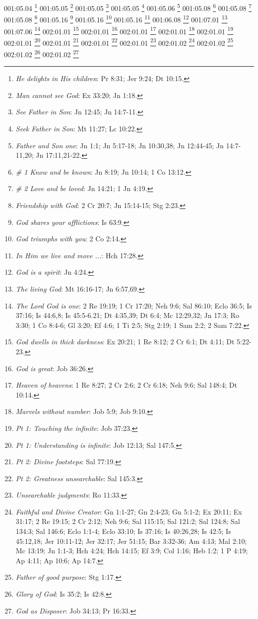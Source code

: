 {001:05.04 \footnote{\textit{He delights in His children}: Pr 8:31; Jer 9:24; Dt 10:15.}
001:05.05 \footnote{\textit{Man cannot see God}: Ex 33:20; Jn 1:18.}
001:05.05 \footnote{\textit{See Father in Son}: Jn 12:45; Jn 14:7-11.}
001:05.05 \footnote{\textit{Seek Father in Son}: Mt 11:27; Lc 10:22.}
001:05.06 \footnote{\textit{Father and Son one}: Jn 1:1; Jn 5:17-18; Jn 10:30,38; Jn 12:44-45; Jn 14:7-11,20; Jn 17:11,21-22.}
001:05.08 \footnote{\textit{# 1 Know and be known}: Jn 8:19; Jn 10:14; 1 Co 13:12.}
001:05.08 \footnote{\textit{# 2 Love and be loved}: Jn 14:21; 1 Jn 4:19.}
001:05.08 \footnote{\textit{Friendship with God}: 2 Cr 20:7; Jn 15:14-15; Stg 2:23.}
001:05.16 \footnote{\textit{God shares your afflictions}: Is 63:9.}
001:05.16 \footnote{\textit{God triumphs with you}: 2 Co 2:14.}
001:05.16 \footnote{\textit{In Him we live and move ...}: Hch 17:28.}
001:06.08 \footnote{\textit{God is a spirit}: Jn 4:24.}
001:07.01 \footnote{\textit{The living God}: Mt 16:16-17; Jn 6:57,69.}
001:07.06 \footnote{\textit{The Lord God is one}: 2 Re 19:19; 1 Cr 17:20; Neh 9:6; Sal 86:10; Eclo 36:5; Is 37:16; Is 44:6,8; Is 45:5-6.21; Dt 4:35,39; Dt 6:4; Mc 12:29,32; Jn 17:3; Ro 3:30; 1 Co 8:4-6; Gl 3:20; Ef 4:6; 1 Ti 2:5; Stg 2:19; 1 Sam 2:2; 2 Sam 7:22.}
002:01.01 \footnote{\textit{God dwells in thick darkness}: Ex 20:21; 1 Re 8:12; 2 Cr 6:1; Dt 4:11; Dt 5:22-23.}
002:01.01 \footnote{\textit{God is great}: Job 36:26.}
002:01.01 \footnote{\textit{Heaven of heavens}: 1 Re 8:27; 2 Cr 2:6; 2 Cr 6:18; Neh 9:6; Sal 148:4; Dt 10:14.}
002:01.01 \footnote{\textit{Marvels without number}: Job 5:9; Job 9:10.}
002:01.01 \footnote{\textit{Pt 1: Touching the infinite}: Job 37:23.}
002:01.01 \footnote{\textit{Pt 1: Understanding is infinite}: Job 12:13; Sal 147:5.}
002:01.01 \footnote{\textit{Pt 2: Divine footsteps}: Sal 77:19.}
002:01.01 \footnote{\textit{Pt 2: Greatness unsearchable}: Sal 145:3.}
002:01.01 \footnote{\textit{Unsearchable judgments}: Ro 11:33.}
002:01.02 \footnote{\textit{Faithful and Divine Creator}: Gn 1:1-27; Gn 2:4-23; Gn 5:1-2; Ex 20:11; Ex 31:17; 2 Re 19:15; 2 Cr 2:12; Neh 9:6; Sal 115:15; Sal 121:2; Sal 124:8; Sal 134:3; Sal 146:6; Eclo 1:1-4; Eclo 33:10; Is 37:16; Is 40:26,28; Is 42:5; Is 45:12,18; Jer 10:11-12; Jer 32:17; Jer 51:15; Bar 3:32-36; Am 4:13; Mal 2:10; Mc 13:19; Jn 1:1-3; Hch 4:24; Hch 14:15; Ef 3:9; Col 1:16; Heb 1:2; 1 P 4:19; Ap 4:11; Ap 10:6; Ap 14:7.}
002:01.02 \footnote{\textit{Father of good purpose}: Stg 1:17.}
002:01.02 \footnote{\textit{Glory of God}: Is 35:2; Is 42:8.}
002:01.02 \footnote{\textit{God as Disposer}: Job 34:13; Pr 16:33.}
}
